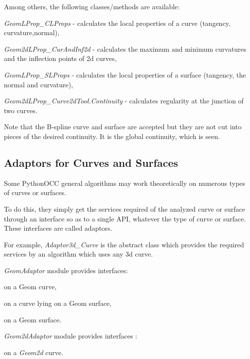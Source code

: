 Among others, the following classes/methods are available\+:
\begin{DoxyItemize}
\item {\itshape Geom\+L\+Prop\+\_\+\+C\+L\+Props} -\/ calculates the local properties of a curve (tangency, curvature,normal),
\item {\itshape Geom2d\+L\+Prop\+\_\+\+Cur\+And\+Inf2d} -\/ calculates the maximum and minimum curvatures and the inflection points of 2d curves,
\item {\itshape Geom\+L\+Prop\+\_\+\+S\+L\+Props} -\/ calculates the local properties of a surface (tangency, the normal and curvature),
\item {\itshape Geom2d\+L\+Prop\+\_\+\+Curve2d\+Tool.\+Continuity} -\/ calculates regularity at the junction of two curves.
\end{DoxyItemize}

Note that the B-\/spline curve and surface are accepted but they are not cut into pieces of the desired continuity. It is the global continuity, which is seen.\hypertarget{occt_user_guides__modeling_data_occt_modat_4_4}{}\subsection{Adaptors for Curves and Surfaces}\label{occt_user_guides__modeling_data_occt_modat_4_4}
Some Python\+O\+CC general algorithms may work theoretically on numerous types of curves or surfaces.

To do this, they simply get the services required of the analyzed curve or surface through an interface so as to a single A\+PI, whatever the type of curve or surface. These interfaces are called adaptors.

For example, {\itshape Adaptor3d\+\_\+\+Curve} is the abstract class which provides the required services by an algorithm which uses any 3d curve.

{\itshape Geom\+Adaptor} module provides interfaces\+:
\begin{DoxyItemize}
\item on a Geom curve,
\item on a curve lying on a Geom surface,
\item on a Geom surface.
\end{DoxyItemize}

{\itshape Geom2d\+Adaptor} module provides interfaces \+:
\begin{DoxyItemize}
\item on a {\itshape Geom2d} curve.
\end{DoxyItemize}

